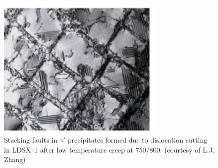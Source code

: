 \begin{figure}[H]
\begin{center}
\includegraphics[width=8cm]{LDSX1faults}
\caption{Stacking faults in $\gamma'$ precipitates formed due to dislocation cutting in LDSX--1 after low temperature creep at 750\celsius/800\mega\pascal. (courtesy of L.J. Zhang)}\label{fig:LDSX1faults}
\end{center}
\end{figure}
%
